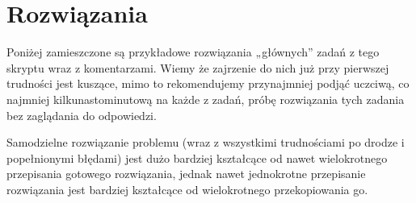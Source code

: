 \section{Rozwiązania}

Poniżej zamieszczone są przykładowe rozwiązania „głównych” zadań z tego skryptu wraz z komentarzami.
Wiemy że zajrzenie do nich już przy pierwszej trudności jest kuszące, mimo to rekomendujemy przynajmniej podjąć uczciwą, co najmniej kilkunastominutową na każde z zadań, próbę rozwiązania tych zadania bez zaglądania do odpowiedzi.

\vspace{7pt}\noindent
{} Samodzielne rozwiązanie problemu (wraz z wszystkimi trudnościami po drodze i popełnionymi błędami) jest dużo bardziej kształcące od nawet wielokrotnego przepisania gotowego rozwiązania, jednak nawet jednokrotne przepisanie rozwiązania jest bardziej kształcące od wielokrotnego przekopiowania go.
